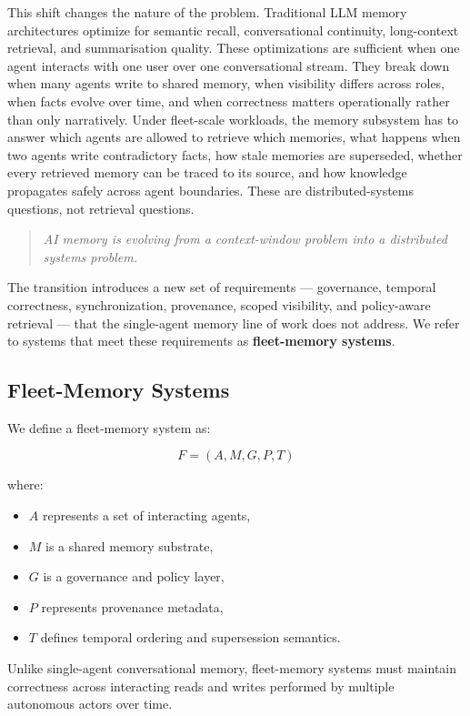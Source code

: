 \documentclass[10pt,twocolumn,letterpaper]{article}
\begin{document}
This shift changes the nature of the problem. Traditional LLM memory architectures optimize for semantic recall, conversational continuity, long-context retrieval, and summarisation quality. These optimizations are sufficient when one agent interacts with one user over one conversational stream. They break down when many agents write to shared memory, when visibility differs across roles, when facts evolve over time, and when correctness matters operationally rather than only narratively. Under fleet-scale workloads, the memory subsystem has to answer which agents are allowed to retrieve which memories, what happens when two agents write contradictory facts, how stale memories are superseded, whether every retrieved memory can be traced to its source, and how knowledge propagates safely across agent boundaries. These are distributed-systems questions, not retrieval questions.

\begin{quote}
\emph{AI memory is evolving from a context-window problem into a distributed systems problem.}
\end{quote}

The transition introduces a new set of requirements --- governance, temporal correctness, synchronization, provenance, scoped visibility, and policy-aware retrieval --- that the single-agent memory line of work does not address. We refer to systems that meet these requirements as \textbf{fleet-memory systems}.

\subsection{Fleet-Memory Systems}

We define a fleet-memory system as:

\[
F = (A, M, G, P, T)
\]

where:
\begin{itemize}
    \item \(A\) represents a set of interacting agents,
    \item \(M\) is a shared memory substrate,
    \item \(G\) is a governance and policy layer,
    \item \(P\) represents provenance metadata,
    \item \(T\) defines temporal ordering and supersession semantics.
\end{itemize}

Unlike single-agent conversational memory, fleet-memory systems must maintain correctness across interacting reads and writes performed by multiple autonomous actors over time.
\end{document}
